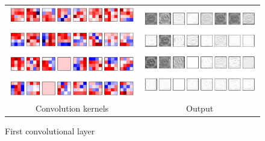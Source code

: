 \documentclass[a4paper, 11pt, table]{article}
\begin{document}
\begin{figure}[H]
\begin{tabular}{cc}
	\includegraphics[scale=0.4]{weight_decay/filters1.png} & \includegraphics[scale=0.4]{weight_decay/conv1.png} \\
	Convolution kernels & Output \\[6pt]
\end{tabular}
\caption{First convolutional layer}
\end{figure}
\end{document}
